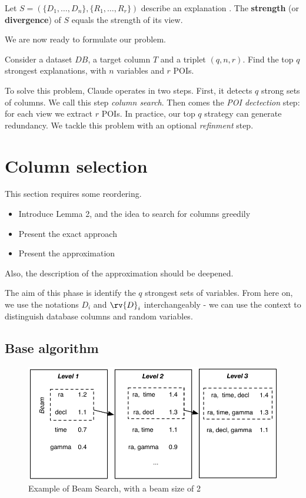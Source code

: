 \begin{definition}
Let $S=(\{ D_1, \ldots, D_n\}, \{R_1, \ldots, R_r\})$ describe an explanation . The
\textbf{strength} (or \textbf{divergence}) of $S$ equals the strength
of its view.
\end{definition}

We are now ready to formulate our problem.

\begin{problem}
Consider a dataset $DB$, a target column $T$ and a triplet $(q, n, r)$. Find
the top $q$ strongest explanations, with $n$ variables and $r$ POIs.
\end{problem}

To solve this problem, Claude operates in two steps. First, it detects $q$
strong sets of columns.  We call this step \emph{column search}.  Then comes
the \emph{POI dectection} step: for each view we extract $r$ POIs. In practice,
our top $q$ strategy can generate redundancy. We tackle this problem with an
optional \emph{refinment} step.

\section{Column selection}
\label{sec:colum}

{\color{red} 
This section requires some reordering.
\begin{itemize}
    \item Introduce Lemma 2, and the idea to search for columns greedily
    \item Present the exact approach
    \item Present the approximation
\end{itemize}
Also, the description of the approximation should be deepened.
}

The aim of this phase is identify the $q$ strongest sets of variables. From
here on, we use the notations $D_i$ and $\rv{D}_i$ interchangeably - we can use
the context to distinguish database columns and random variables.

\subsection{Base algorithm}
\begin{figure}[t!]
\centering
\includegraphics[width=0.8\columnwidth]{images/beam-search}
\caption{Example of Beam Search, with a beam size of 2}
\label{pic:beam-search}
\end{figure}

